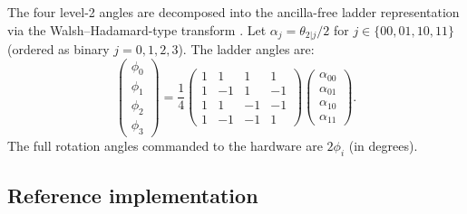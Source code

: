 \documentclass[11pt,a4paper]{article}
\begin{document}
The four level-2 angles are decomposed into the ancilla-free
ladder representation via the Walsh--Hadamard-type transform
\cite{FalcoFalcoPomaresMatthies2026}. Let
$\alpha_j = \theta_{2|j}/2$ for $j \in \{00, 01, 10, 11\}$
(ordered as binary $j = 0, 1, 2, 3$). The ladder angles are:
\begin{equation}
  \begin{pmatrix} \phi_0 \\ \phi_1 \\ \phi_2 \\ \phi_3 \end{pmatrix}
  = \frac{1}{4}
  \begin{pmatrix}
    1 & 1 & 1 & 1 \\
    1 & -1 & 1 & -1 \\
    1 & 1 & -1 & -1 \\
    1 & -1 & -1 & 1
  \end{pmatrix}
  \begin{pmatrix}
    \alpha_{00} \\ \alpha_{01} \\ \alpha_{10} \\ \alpha_{11}
  \end{pmatrix}.
  \label{eq:wht}
\end{equation}
The full rotation angles commanded to the hardware are
$2\phi_i$ (in degrees).

\subsection{Reference implementation}
\end{document}
